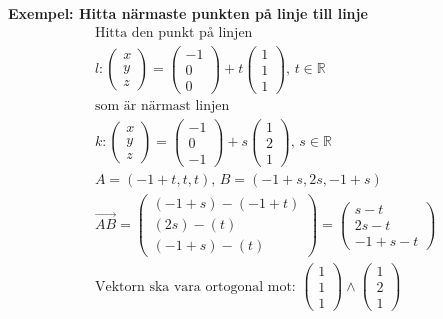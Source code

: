 \begin{multicols}{2}
\textbf{Exempel: Hitta närmaste punkten på linje till linje} %
\begin{align*}
  &\text{Hitta den punkt på linjen } \\
  &l: \begin{pmatrix} x \\ y \\ z \end{pmatrix} = \begin{pmatrix} -1 \\ 0 \\ 0 \end{pmatrix} +
  t\begin{pmatrix} 1 \\ 1 \\ 1 \end{pmatrix}, \, t\in\mathbb{R} \\
  &\text{som är närmast linjen } \\
  &
  k: \begin{pmatrix} x \\ y \\ z \end{pmatrix} = \begin{pmatrix} -1 \\ 0 \\ -1 \end{pmatrix} +
  s\begin{pmatrix} 1 \\ 2 \\ 1 \end{pmatrix}, \, s\in\mathbb{R} \\
  &A=(-1+t,t,t), \, B=(-1+s,2s,-1+s) \\
  &\overrightarrow{AB}=
  \begin{pmatrix} (-1+s)-(-1+t) \\ (2s)-(t) \\ (-1+s)-(t) \end{pmatrix} =
  \begin{pmatrix} s-t \\ 2s-t \\ -1+s-t \end{pmatrix} \\
  &\text{Vektorn ska vara ortogonal mot: }
  \begin{pmatrix} 1 \\ 1 \\ 1 \end{pmatrix} \land
  \begin{pmatrix} 1 \\ 2 \\ 1 \end{pmatrix} \\

\end{align*}
\end{multicols}

